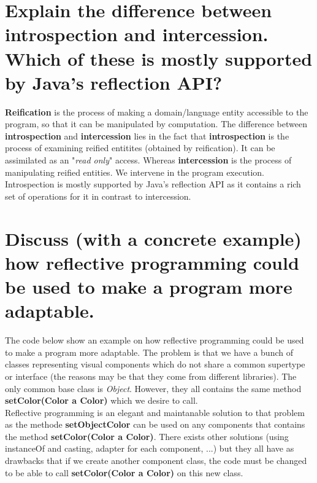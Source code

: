 \section{Explain the difference between introspection and intercession. Which of these is mostly
supported by Java’s reflection API?}

\textbf{Reification } is the process of making a domain/language entity accessible to the program, so that it can be manipulated by computation.
The difference between \textbf{introspection} and \textbf{intercession} lies in the fact that \textbf{introspection} is the process of examining reified entitites (obtained by reification). It can be assimilated as an  "\textit{read only}" access. Whereas \textbf{intercession} is the process of manipulating reified entities. We intervene in the program execution. \\

Introspection is mostly supported by Java's reflection API as it contains a rich set of operations for it in contrast to intercession.

\section{Discuss (with a concrete example) how reflective programming could be used to make a
program more adaptable.}

The code below show an example on how reflective programming could be used to make a program more adaptable. The problem is that we have a bunch of classes representing visual components which do not share a common supertype or interface (the reasons may be that they come from different libraries). The only common base class is \textit{Object}. However, they all contains the same method \textbf{setColor(Color a Color)}  which we desire to call. \\

Reflective programming is an elegant and maintanable solution to that problem as the methode \textbf{setObjectColor} can be used on any components that contains the method  \textbf{setColor(Color a Color)}. There exists other solutions (using instanceOf and casting, adapter for each component, ...) but they all have as drawbacks that if we create another component class, the code must be changed to be able to call  \textbf{setColor(Color a Color)} on this new class.

